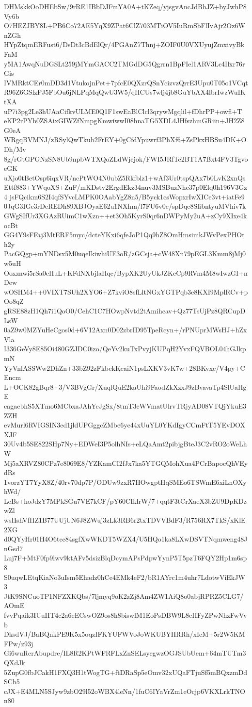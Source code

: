 DHMskkOoDHEbSw/9rRE1IBbDJFmYA0A+tKZeq/yjsgvAncJdBhJZ+byJwhP8Vy6b
O7HEZJBY8L+PB6Co72AE5YqX9ZPat6ClZ703MTiOV5IuRmSbFlIvAjr2Oz6WnZGh
HYpZtqmERFust6/DsDt3cBdElQr/4PGAnZ7Thnj+ZOIF0U0VXUyujZmxivyBkFaM
y5IA1AwqNuDGSLt259jMYmGACC2TMGdDG5Qgrrn1BpFIel1ARV3Lc4Ilxr76rGis
IVMRktCEr0mDD3d1VtukojnPet+7pfcE0QXzrQSnYcizvzQrrE3Upu0T05o1VCqt
R96Z6GSlzPJ5FbOu6jNLPqMqQwU3W5/qHCUs7wlj4jb8GuYbAX4lbrIwzWuIKtXA
uP7i3pg2Le3hUAaCifkvULME0Q1F1swEaBlClcl3qrywMgqlil+fDhrPP+owfl+T
eKP2rPYb0ZSAixGIWZfNmpgKmwiwwI08hnaTG5XDL4JHfszhmGRiin+JH2Z8G0eA
WRgqBVMNJ/zRSylQwTkub2FrEY+0gCfdYpuwrf3PhXf6+ZsPkxHBSu4DK+ODh/Mv
8g/rGtGPGNzSN8Ub9npbWTXQoZLdWjcjok/FWI5JRfTe2BT1A7Bxt4FV3TgvoeGK
uXjo0tBetOsp6iqxVR/ncPtWO4N0ubZ5Rkfblz1+wAf3Ur0tspQAx7b0LvK2xnQs
Ettf883+YWqoXS+ZuF/mKDstv2ErgdEkz34nuv3MSBuzNhc37p0Elq0h196V3Gz4
jsFQcikm6S2I4qfSYvcLMPK0OAabYgZ8n5/B5yck1csWopxrIwXICe3vt+iatFe9
0JqG3IGe3rDeREDh89XBJOyaE62u1NXhm/l7FU6v0e/spDqe8SfibntyuMVhiv7k
GWgSIfUr3XGAzRUimC1wXzn++et3Oh5KyrS0qr6nDWPyMy2uA+zCy9XIxe4kocBt
GG4Y9sFFaj3MtERF5myc/dcteYKxi6qfeJoP1Qq9hZ8OmHmsimkJWvPexPHOth2y
PacGQgp+mYNDsx5M0uqeIkiwhiUF3oR/zGCsja+cW48Xn79pEGL3Kmm8jMj0w5uH
Ooxznwi5rSa0cHuL+KFdNXbjlaHqe/BypXK2UyUkJZKcCp9RVm4M8wIwzGI+nDew
wOSHM4++0VIXT7SUh2XYO6+Z7kviO8sfLltNGxYGTPqb3e8KXI9MplRCv+pOo8qZ
gRSE88zH1Qh7i1QoO0/CehC1C7HOwpNvtd2tAmihcav+Qz77TsUjPz8QRCupDLsW
0aZ9w0MZYuHeCgos0d+6V12Axn0D02zbrID95TpeRcyn+/rPNUprMWsHJ+hZxVla
I336GeVy8E85Oi480GZJDC0izo/QeYv2kuTxPvyjKUPqH2YvxFQVBOL04hGJkpmN
YyVnlASSWw2DhZn+33bZ92zFkbekKeaiN1psLXKV3vK7w+28BKvxe/V4py+CEncm
L+OCK82gBqr8+3/V3BVgGr/XuqlQuE2kaUhi9FaodZkXzxJ9zBvavaTp4SlUaHgE
cagacbhS5XTmo6MCbxaJAhYeJgSx/8tmT3eWVmatUlrvTRjyAD08VTQjYkuE3ZZH
evMurl6RVIGSIN3ed1jldUPGggcZMbe6yc44xUuYL0YKdIgyCCmFtT5YEvDOXXJF
30Uv4b5SE822SHp7Ny+EDWeI3P5olhNIs+eLQaAmt2pibjgBteJ3C2vRO2oWeLhW
Mj5aXRVZ80CPz7e8069E8/YZKamCI2fJx7ka5YTGQMohXua4PCrBapocQhVEydRs
1vorzYT7YyX8Z/40rv70dp7P/ODUw9zxR7HOwgptHqSMEo6TSWmE6xiLnOXyhWd/
LeBs+hoJdzY7MPkSGu7VE7kCF/pY60CIklrW/7+qqtF3tCrXaeX3bZU9DpKDzwZl
wsHshVfHZ1B77UUjUN6J8ZWuj3zLk3RB6r2txTDVVBdF3/R756RX7TkS/xKlE2XG
d0QYyHr01H4O6tcc84sgfXwWKDT5WZX4/U5HQo1ka8LXwDSVTNqmweng48JnGsd7
Luj7F+MtF0fp9lwv9ktAFv5dsizBlqDcymAPsPdpwYynP5T5pzT6FQY2Hp1m6sp8
S0uqwLEtqKiaNo3uIsm5Ehadz0hCe4EMk4eF2/bR1AYrc1m4uhr7LdotwViEkJW3
JtK9SNCuoTP1NFZXKQbs/7ljmyq9oK2zZj8Am4ZW1AiQ8o0abjRPRZ5CLG7/AOmE
fvvPqaik3IUuHT4c2a6eECswOZ9os8h8biswlM1EoPsDBW9L8cHFyZPwNhzFwVvb
DksdVJ/BaBQnkPE9K5x5oqzIFKYUFWVoJoWKUBYHRRh/xIcM+5r2W5KMFPw/z93j
Gi6wuRerAbupdre/IL8R2KPtWFRFLxZnSELsyegwzOGJSUbUem+64mTUTm3QXdJk
5ZupG0fbJCakH1FXQ3H1tWogTG+ftDRaSp5eOmv32xUQaFTjuSf5mBQxzmDdSCb5
cJX+E4MLN5SJyw9zbO29l52oWBX4leNn/1fuC6IYaVrZm1eOcjp6VKXLrkTNOn80
